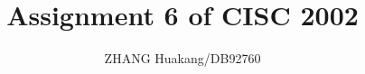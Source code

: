 \documentclass{article}
\title{Assignment 6 of CISC 2002}
\author{ZHANG Huakang/DB92760}
\begin{document}
    \maketitle
    \section{}
        \subsection{}
        \paragraph{}
            
            
            
            
        \subsection{}
            \paragraph{}
            
            
        \subsection{}
            
\end{document}

